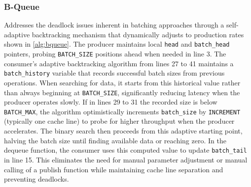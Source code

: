 \subsubsection{B-Queue}
Addresses the deadlock issues inherent in batching approaches through a self-adaptive backtracking mechanism that dynamically adjusts to production rates shown in \cref{alg:bqueue}. The producer maintains local \texttt{head} and \texttt{batch\_head} pointers, probing \texttt{BATCH\_SIZE} positions ahead when needed in line 3. The consumer's adaptive backtracking algorithm from lines 27 to 41 maintains a \texttt{batch\_history} variable that records successful batch sizes from previous operations. When searching for data, it starts from this historical value rather than always beginning at \texttt{BATCH\_SIZE}, significantly reducing latency when the producer operates slowly. If in lines 29 to 31 the recorded size is below \texttt{BATCH\_MAX}, the algorithm optimistically increments \texttt{batch\_size} by \texttt{INCREMENT} (typically one cache line) to probe for higher throughput when the producer accelerates. The binary search then proceeds from this adaptive starting point, halving the batch size until finding available data or reaching zero. In the dequeue function, the consumer uses this computed value to update \texttt{batch\_tail} in line 15. This eliminates the need for manual parameter adjustment or manual calling of a publish function while maintaining cache line separation and preventing deadlocks. \cite{Wang2013BQueue}


